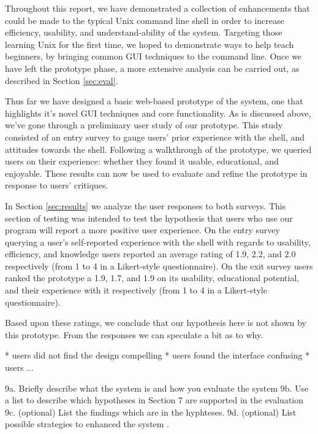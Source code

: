 Throughout this report, we have demonstrated a collection of enhancements that
could be made to the typical Unix command line shell in order to increase
efficiency, usability, and understand-ability of the system. Targeting those
learning Unix for the first time, we hoped to demonstrate ways to help teach
beginners, by bringing common GUI techniques to the command line. Once we have
left the prototype phase, a more extensive analysis can be carried out, as
described in Section \ref{sec:eval}.

Thus far we have designed a basic web-based prototype of the system, one that
highlights it's novel GUI techniques and core functionality. As is discussed
above, we've gone through a preliminary user study of our prototype. This study
consisted of an entry survey to gauge users' prior experience with the shell,
and attitudes towards the shell. Following a walkthrough of the prototype, we
queried users on their experience: whether they found it usable, educational,
and enjoyable. These results can now be used to evaluate and refine the
prototype in response to users' critiques.

In Section \ref{sec:results} we analyze the user responses to both surveys. This
section of testing was intended to test the hypothesis that users who use our
program will report a more positive user experience. On the entry survey
querying a user's self-reported experience with the shell with regards to
usability, efficiency, and knowledge users reported an average rating of 1.9,
2.2, and 2.0 respectively (from 1 to 4 in a Likert-style questionnaire). On the
exit survey users ranked the prototype a 1.9, 1.7, and 1.9 on its usability,
educational potential, and their experience with it respectively (from 1 to 4 in
a Likert-style questionnaire).

Based upon these ratings, we conclude that our hypothesis here is not shown by
this prototype. From the responses we can speculate a bit as to why.

* users did not find the design compelling
* users found the interface confusing
* users ...

9a. Briefly describe what the system is and how you evaluate the system
9b. Use a list to describe which hypotheses in Section 7 are supported in the evaluation
9c. (optional) List the findings which are in the hyphteses.
9d. (optional) List possible strategies to enhanced the system
.
